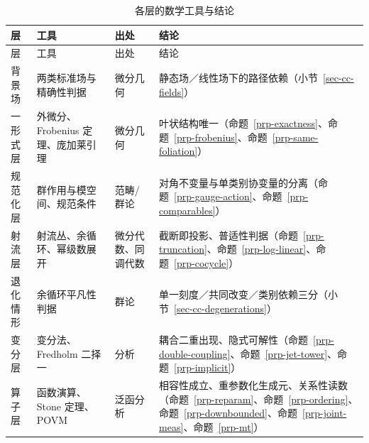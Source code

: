 \documentclass[
  chinese,
  a4paper,
  UTF8,
  12pt,
  oneside,
  openany]{ctexbook}
\theoremstyle{plain}
\theoremstyle{plain}
\theoremstyle{plain}
\theoremstyle{definition}
\theoremstyle{plain}
\theoremstyle{plain}
\theoremstyle{remark}
\begin{document}
\begin{longtable}[]{@{}
  >{\raggedright\arraybackslash}p{}
  >{\raggedright\arraybackslash}p{}
  >{\raggedright\arraybackslash}p{}
  >{\raggedright\arraybackslash}p{}@{}}
\caption{各层的数学工具与结论}\label{tbl-toolkit}\tabularnewline
\toprule\noalign{}
\begin{minipage}[b]{\linewidth}\raggedright
层
\end{minipage} & \begin{minipage}[b]{\linewidth}\raggedright
工具
\end{minipage} & \begin{minipage}[b]{\linewidth}\raggedright
出处
\end{minipage} & \begin{minipage}[b]{\linewidth}\raggedright
结论
\end{minipage} \\
\midrule\noalign{}
\endfirsthead
\toprule\noalign{}
\begin{minipage}[b]{\linewidth}\raggedright
层
\end{minipage} & \begin{minipage}[b]{\linewidth}\raggedright
工具
\end{minipage} & \begin{minipage}[b]{\linewidth}\raggedright
出处
\end{minipage} & \begin{minipage}[b]{\linewidth}\raggedright
结论
\end{minipage} \\
\midrule\noalign{}
\endhead
\bottomrule\noalign{}
\endlastfoot
背景场 & 两类标准场与精确性判据 & 微分几何 &
静态场／线性场下的路径依赖（小节~\ref{sec-cc-fields}） \\
一形式层 & 外微分、Frobenius 定理、庞加莱引理 & 微分几何 &
叶状结构唯一（命题~\ref{prp-exactness}、命题~\ref{prp-frobenius}、命题~\ref{prp-same-foliation}） \\
规范化层 & 群作用与模空间、规范条件 & 范畴/群论 &
对角不变量与单类别协变量的分离（命题~\ref{prp-gauge-action}、命题~\ref{prp-comparables}） \\
射流层 & 射流丛、余循环、幂级数展开 & 微分代数、同调代数 &
截断即投影、普适性判据（命题~\ref{prp-truncation}、命题~\ref{prp-log-linear}、命题~\ref{prp-cocycle}） \\
退化情形 & 余循环平凡性判据 & 群论 &
单一刻度／共同改变／类别依赖三分（小节~\ref{sec-cc-degenerations}） \\
变分层 & 变分法、Fredholm 二择一 & 分析 &
耦合二重出现、隐式可解性（命题~\ref{prp-double-coupling}、命题~\ref{prp-jet-tower}、命题~\ref{prp-implicit}） \\
算子层 & 函数演算、Stone 定理、POVM & 泛函分析 &
相容性成立、重参数化生成元、关系性读数（命题~\ref{prp-reparam}、命题~\ref{prp-ordering}、命题~\ref{prp-downbounded}、命题~\ref{prp-joint-meas}、命题~\ref{prp-mt}） \\
\end{longtable}
\end{document}
